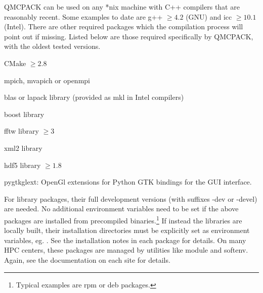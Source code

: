 QMCPACK can be used on any *nix machine with C++ compilers that are reasonably recent.  Some examples to date are g++ $\geq 4.2$ (GNU) and icc $\geq 10.1$ (Intel).  There are other required packages which the compilation process will point out if missing.  Listed below are those required specifically by QMCPACK, with the oldest tested versions.
\begin{itemize*}
\item{} CMake $\geq 2.8$
\item{} mpich, mvapich or openmpi
\item{} blas or lapack library (provided as mkl in Intel compilers)
\item{} boost library
\item{} fftw library $\geq 3$
\item{} xml2 library
\item{} hdf5 library $\geq 1.8$
\item{} pygtkglext: OpenGl extensions for Python GTK bindings for the GUI interface.
\end{itemize*}
For library packages, their full development versions (with suffixes -dev or -devel) are needed.  No additional environment variables need to be set if the above packages are installed from precompiled binaries.\footnote{Typical examples are rpm or deb packages.}  If instead the libraries are locally built, their installation directories must be explicitly set as environment variables, eg. .  See the installation notes in each package for details.  On many HPC centers, these packages are managed by utilities like module and softenv.  Again, see the documentation on each site for details.


